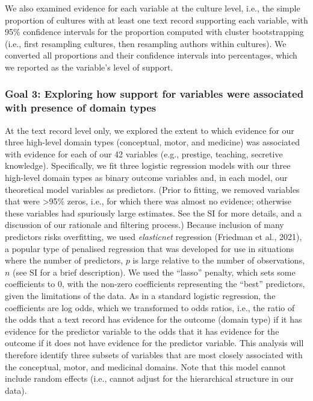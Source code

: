 \documentclass[
  11pt,
]{article}
\begin{document}
We also examined evidence for each variable at the culture level, i.e., the simple proportion of cultures with at least one text record supporting each variable, with 95\% confidence intervals for the proportion computed with cluster bootstrapping (i.e., first resampling cultures, then resampling authors within cultures). We converted all proportions and their confidence intervals into percentages, which we reported as the variable's level of support.

\hypertarget{goal-3-exploring-how-support-for-variables-were-associated-with-presence-of-domain-types}{%
\subsubsection{Goal 3: Exploring how support for variables were associated with presence of domain types}\label{goal-3-exploring-how-support-for-variables-were-associated-with-presence-of-domain-types}}

At the text record level only, we explored the extent to which evidence for our three high-level domain types (conceptual, motor, and medicine) was associated with evidence for each of our 42 variables (e.g., prestige, teaching, secretive knowledge). Specifically, we fit three logistic regression models with our three high-level domain types as binary outcome variables and, in each model, our theoretical model variables as predictors. (Prior to fitting, we removed variables that were \textgreater95\% zeros, i.e., for which there was almost no evidence; otherwise these variables had spuriously large estimates. See the SI for more details, and a discussion of our rationale and filtering process.) Because inclusion of many predictors risks overfitting, we used \emph{elasticnet} regression (Friedman et al., 2021), a popular type of penalised regression that was developed for use in situations where the number of predictors, \(p\) is large relative to the number of observations, \(n\) (see SI for a brief description). We used the ``lasso'' penalty, which sets some coefficients to 0, with the non-zero coefficients representing the ``best'' predictors, given the limitations of the data. As in a standard logistic regression, the coefficients are log odds, which we transformed to odds ratios, i.e., the ratio of the odds that a text record has evidence for the outcome (domain type) if it has evidence for the predictor variable to the odds that it has evidence for the outcome if it does not have evidence for the predictor variable. This analysis will therefore identify three subsets of variables that are most closely associated with the conceptual, motor, and medicinal domains. Note that this model cannot include random effects (i.e., cannot adjust for the hierarchical structure in our data).
\end{document}
